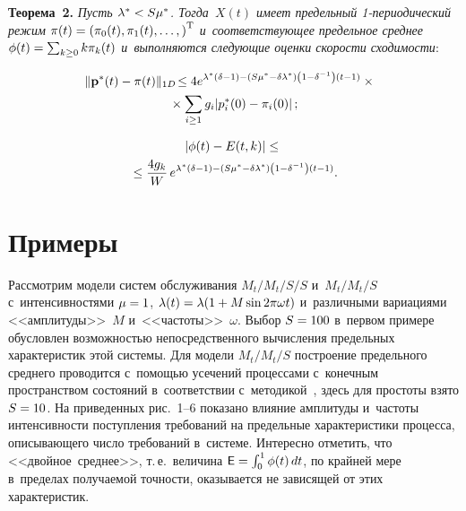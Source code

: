 \begin{multicols}{2}
\noindent
\textbf{Теорема~2.}
\textit{Пусть $\la^* \hm< S\mu^*$. Тогда~$X(t)$ имеет предельный 1-периодический
режим  ${\bf \pi}(t)
\hm=\left(\pi_0(t),\pi_1(t),\dots,\right)^\mathrm{T} $ 
и~соответствующее предельное среднее $\phi(t) \hm= \sum\nolimits_{k \ge 0}
k\pi_k(t)$ и~выполняются сле\-ду\-ющие оценки скорости сходимости}:

\noindent
\begin{multline*}
\!\!\!\|{\bf p^*}(t) - {\bf \pi}(t)\|_{1D} \! \le 4 e^{\lambda^*\left(\delta -
1\right)-\left(S\mu^*-\delta\lambda^*\right)\left(1-\delta^{-1}\right)\left(t-1\right)}\times{}\\
{}\times \sum_{i \ge 1}g_i |p^*_i(0) - \pi_i(0)|\,; 
\end{multline*}

\vspace*{-18pt}

\noindent
\begin{multline*}
\left|\phi(t) - E(t,k)\right| \le{}\\[-1pt]
{}\le \displaystyle\frac{\displaystyle 4g_k\mathstrut}{\displaystyle W\mathstrut}\,
e^{\lambda^*\left(\delta - 1\right)-
\left(S\mu^*-\delta\lambda^*\right)\left(1-\delta^{-1}\right)\left(t-1\right)}. 
\end{multline*}

\vspace*{-16pt}

\section{Примеры}

Рассмотрим модели систем обслуживания $M_t/M_t/S/S$ и~$M_t/M_t/S$  
с~интенсивностями  $\mu\hm=1$, $\la(t)\hm=\la(1+M\sin 2\pi\omega t)$ 
и~различными вариациями <<амплитуды>>~$M$ и~<<частоты>>~$\omega$. Выбор $S \hm=100$ 
в~первом примере обусловлен возможностью непосредственного
вычисления предельных характеристик этой системы. Для модели
$M_t/M_t/S$ постро\-ение предельного среднего проводится с~по\-мощью
усечений процессами с~конечным пространством состояний 
в~соответствии с~методикой~\cite{Zeifman2014i}, здесь
для простоты
взято $S\hm=10$. На приведенных рис.~1--6 показано влияние амплитуды 
и~частоты
 интенсивности поступления требований на предельные
характеристики процесса, описывающего число требований в~системе.
Интересно отметить, что <<двойное~среднее>>, т.\,е.\ величина
$\textsf{E}\hm=\int\nolimits_0^1\phi(t)\,dt$,
 по крайней мере в~пределах
получаемой точности, оказывается не зависящей от этих характеристик.



\end{multicols}
